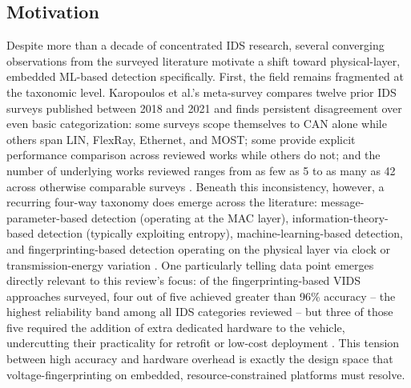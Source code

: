 \documentclass[journal]{IEEEtran}
\begin{document}
	\subsection{Motivation}
	
	Despite more than a decade of concentrated IDS research, several
	converging observations from the surveyed literature motivate a shift
	toward physical-layer, embedded ML-based detection specifically. First,
	the field remains fragmented at the taxonomic level. Karopoulos et al.'s
	meta-survey compares twelve prior IDS surveys published between 2018 and
	2021 and finds persistent disagreement over even basic categorization:
	some surveys scope themselves to CAN alone while others span LIN,
	FlexRay, Ethernet, and MOST; some provide explicit performance comparison
	across reviewed works while others do not; and the number of underlying
	works reviewed ranges from as few as 5 to as many as 42 across otherwise
	comparable surveys \cite{ref9}. Beneath this inconsistency, however, a
	recurring four-way taxonomy does emerge across the literature:
	message-parameter-based detection (operating at the MAC layer),
	information-theory-based detection (typically exploiting entropy),
	machine-learning-based detection, and fingerprinting-based detection
	operating on the physical layer via clock or transmission-energy
	variation \cite{ref9}. One particularly telling data point emerges
	directly relevant to this review's focus: of the fingerprinting-based
	VIDS approaches surveyed, four out of five achieved greater than 96\%
	accuracy -- the highest reliability band among all IDS categories
	reviewed -- but three of those five required the addition of extra
	dedicated hardware to the vehicle, undercutting their practicality for
	retrofit or low-cost deployment \cite{ref9}. This tension between high
	accuracy and hardware overhead is exactly the design space that
	voltage-fingerprinting on embedded, resource-constrained platforms must
	resolve.
	
\end{document}
